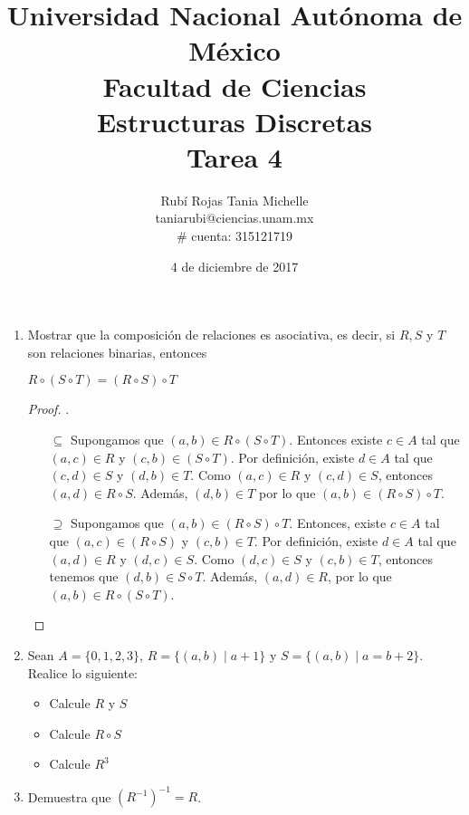\documentclass[letterpaper,11pt]{article}
\title{Universidad Nacional Autónoma de México \\
       Facultad de Ciencias \\
       Estructuras Discretas \\ 
       Tarea 4}
\author{Rubí Rojas Tania Michelle \\
        taniarubi@ciencias.unam.mx \\
        \# cuenta: 315121719}
\date{4 de diciembre de 2017}
\begin{document}
\maketitle

\begin{enumerate}
    \item Mostrar que la composición de relaciones es asociativa, es decir, si
    $R, S$ y $T$ son relaciones binarias, entonces

    \begin{center}
        $R ∘ (S ∘ T) = (R ∘ S) ∘ T$
    \end{center}

    \begin{proof} .
        \begin{itemize}
            \item[$⊆$] Supongamos que $(a, b) \in R ∘ (S ∘ T)$. Entonces existe 
            $c \in A$ tal que $(a, c) \in R$ y $(c, b) \in (S ∘ T)$. Por 
            definición, existe $d \in A$ tal que $(c,d) \in S$ y 
            $(d, b) \in T$. Como $(a, c) \in R$ y $(c,d) \in S$, entonces 
            $(a, d) \in R ∘ S$. Además, $(d, b) \in T$ por lo que 
            $(a, b) \in (R ∘ S) ∘ T$.
            
            \item[$⊇$] Supongamos que $(a,b) \in (R ∘ S) ∘ T$. Entonces, existe
            $c \in A$ tal que $(a,c) \in (R ∘ S)$ y $(c,b) \in T$. Por definición,
            existe $d \in A$ tal que $(a, d) \in R$ y $(d, c) \in S$. Como $
            (d,c) \in S$ y $(c,b) \in T$, entonces tenemos que $(d, b) \in S ∘ T$.
            Además, $(a, d) \in R$, por lo que $(a, b) \in R ∘ (S ∘ T)$.  
        \end{itemize}
    \end{proof}

    \item Sean $A = \{0, 1, 2, 3\}$, $R = \{(a,b) \; | \; a+1\}$ y 
    $S = \{(a,b) \; | \; a = b+2\}$. Realice lo siguiente:

    \begin{itemize}
        \item Calcule $R$ y $S$
        \item Calcule $R ∘ S$
        \item Calcule $R^{3}$
    \end{itemize}

    \item Demuestra que $(R^{-1})^{-1} = R$.


\end{enumerate}
\end{document}
